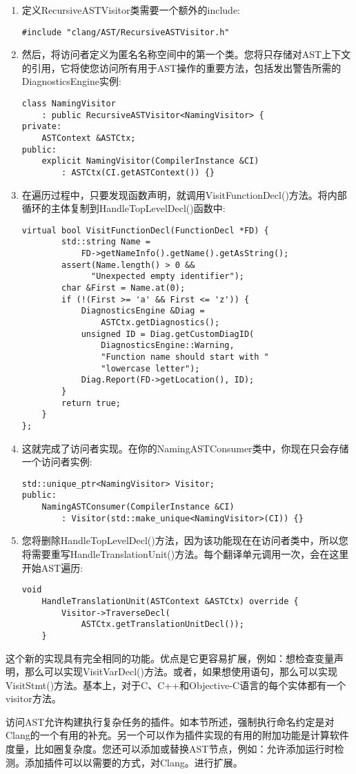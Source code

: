 \begin{enumerate}
\item 定义RecursiveASTVisitor类需要一个额外的include:
\begin{lstlisting}[caption={}]
#include "clang/AST/RecursiveASTVisitor.h"
\end{lstlisting}

\item 然后，将访问者定义为匿名名称空间中的第一个类。您将只存储对AST上下文的引用，它将使您访问所有用于AST操作的重要方法，包括发出警告所需的DiagnosticsEngine实例:
\begin{lstlisting}[caption={}]
class NamingVisitor
	: public RecursiveASTVisitor<NamingVisitor> {
private:
	ASTContext &ASTCtx;
public:
	explicit NamingVisitor(CompilerInstance &CI)
		: ASTCtx(CI.getASTContext()) {}
\end{lstlisting}

\item 在遍历过程中，只要发现函数声明，就调用VisitFunctionDecl()方法。将内部循环的主体复制到HandleTopLevelDecl()函数中:
\begin{lstlisting}[caption={}]
	virtual bool VisitFunctionDecl(FunctionDecl *FD) {
		std::string Name =
			FD->getNameInfo().getName().getAsString();
		assert(Name.length() > 0 &&
			  "Unexpected empty identifier");
		char &First = Name.at(0);
		if (!(First >= 'a' && First <= 'z')) {
			DiagnosticsEngine &Diag =
				ASTCtx.getDiagnostics();
			unsigned ID = Diag.getCustomDiagID(
				DiagnosticsEngine::Warning,
				"Function name should start with "
				"lowercase letter");
			Diag.Report(FD->getLocation(), ID);
		}
		return true;
	}
};
\end{lstlisting}

\item 这就完成了访问者实现。在你的NamingASTConsumer类中，你现在只会存储一个访问者实例:
\begin{lstlisting}[caption={}]
	std::unique_ptr<NamingVisitor> Visitor;
public:
	NamingASTConsumer(CompilerInstance &CI)
		: Visitor(std::make_unique<NamingVisitor>(CI)) {}
\end{lstlisting}

\item 您将删除HandleTopLevelDecl()方法，因为该功能现在在访问者类中，所以您将需要重写HandleTranslationUnit()方法。每个翻译单元调用一次，会在这里开始AST遍历:
\begin{lstlisting}[caption={}]
	void
	HandleTranslationUnit(ASTContext &ASTCtx) override {
		Visitor->TraverseDecl(
			ASTCtx.getTranslationUnitDecl());
	}
\end{lstlisting}

\end{enumerate}

这个新的实现具有完全相同的功能。优点是它更容易扩展，例如：想检查变量声明，那么可以实现VisitVarDecl()方法。或者，如果想使用语句，那么可以实现VisitStmt()方法。基本上，对于C、C++和Objective-C语言的每个实体都有一个visitor方法。\par

访问AST允许构建执行复杂任务的插件。如本节所述，强制执行命名约定是对Clang的一个有用的补充。另一个可以作为插件实现的有用的附加功能是计算软件度量，比如圈复杂度。您还可以添加或替换AST节点，例如：允许添加运行时检测。添加插件可以以需要的方式，对Clang。进行扩展。\par









